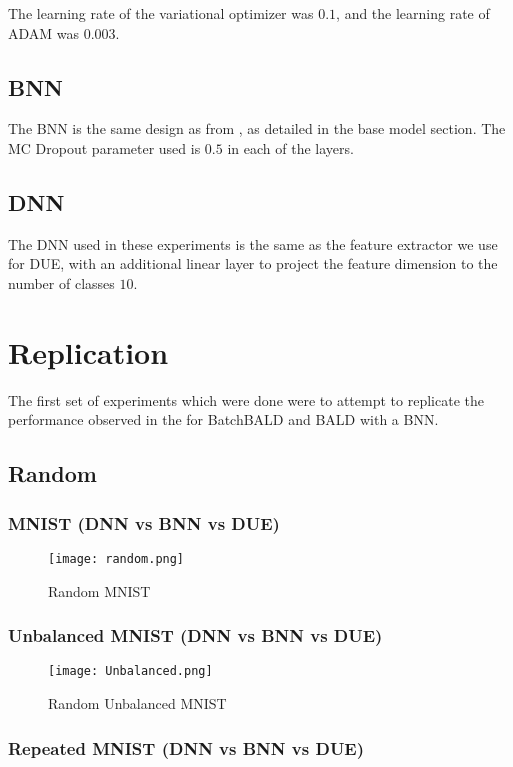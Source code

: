 \documentclass[12pt, a4paper]{report}
\theoremstyle{definition}
\theoremstyle{definition}
\theoremstyle{definition}
\begin{document}
The learning rate of the variational optimizer was $0.1$, and the learning rate of ADAM was $0.003$.

\subsection{BNN}

The BNN is the same design as from \cite{kirsch2019batchbald}, as detailed in the base model section. The MC Dropout parameter used is $0.5$ in each of the layers.

\subsection{DNN}

The DNN used in these experiments is the same as the feature extractor we use for DUE, with an additional linear layer to project the feature dimension to the number of classes $10$.


\section{Replication}

The first set of experiments which were done were to attempt to replicate the performance observed in the \cite{kirsch2019batchbald} for BatchBALD and BALD with a BNN.

\subsection{Random}

\subsubsection{MNIST (DNN vs BNN vs DUE)}

\begin{figure}[H]
\centering
\texttt{[image: random.png]}
\caption{Random MNIST}
\end{figure}

\subsubsection{Unbalanced MNIST (DNN vs BNN vs DUE)}

\begin{figure}[H]
\centering
\texttt{[image: Unbalanced.png]}
\caption{Random Unbalanced MNIST}
\end{figure}
\subsubsection{Repeated MNIST (DNN vs BNN vs DUE)}
\end{document}
